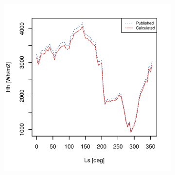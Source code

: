 \begin{figure}[h]
\captionsetup[subfigure]{justification=centering}
\vspace{-2ex}
\centering
    \setlength{\subfigureWidth}{0.50\textwidth}
    \setlength{\graphicsHeight}{60mm}
    \hypersetup{hidelinks=true}%
    \begin{subfigure}[t]{\subfigureWidth}
        \centering
            \includegraphics[height=\graphicsHeight]{sections/appendix/insolation-calculation-verification/plots/hh-exp-calc-at-vl1.png}
            \label{fig:sub:comparative-global-insolation-at-vl1-horizontal-daily-variations}
    \end{subfigure}\hfill
    \begin{subfigure}[t]{\subfigureWidth}
        \centering

\end{subfigure}
\end{figure}
